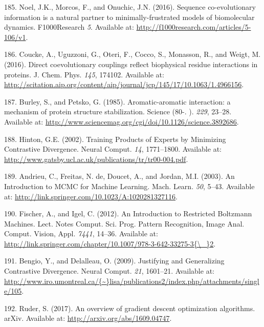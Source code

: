 \documentclass[11pt,a4paper,twoside]{book}
\theoremstyle{definition}
\theoremstyle{definition}
\theoremstyle{remark}
\begin{document}
\hypertarget{ref-Noel2016}{}
185. Noel, J.K., Morcos, F., and Onuchic, J.N. (2016). Sequence
co-evolutionary information is a natural partner to minimally-frustrated
models of biomolecular dynamics. F1000Research \emph{5}. Available at:
\url{http://f1000research.com/articles/5-106/v1}.

\hypertarget{ref-Coucke2016}{}
186. Coucke, A., Uguzzoni, G., Oteri, F., Cocco, S., Monasson, R., and
Weigt, M. (2016). Direct coevolutionary couplings reflect biophysical
residue interactions in proteins. J. Chem. Phys. \emph{145}, 174102.
Available at:
\url{http://scitation.aip.org/content/aip/journal/jcp/145/17/10.1063/1.4966156}.

\hypertarget{ref-Burley1985}{}
187. Burley, S., and Petsko, G. (1985). Aromatic-aromatic interaction: a
mechanism of protein structure stabilization. Science (80-. ).
\emph{229}, 23--28. Available at:
\url{http://www.sciencemag.org/cgi/doi/10.1126/science.3892686}.

\hypertarget{ref-Hinton2002}{}
188. Hinton, G.E. (2002). Training Products of Experts by Minimizing
Contrastive Divergence. Neural Comput. \emph{14}, 1771--1800. Available
at: \url{http://www.gatsby.ucl.ac.uk/publications/tr/tr00-004.pdf}.

\hypertarget{ref-Andrieu2003}{}
189. Andrieu, C., Freitas, N. de, Doucet, A., and Jordan, M.I. (2003).
An Introduction to MCMC for Machine Learning. Mach. Learn. \emph{50},
5--43. Available at:
\url{http://link.springer.com/10.1023/A:1020281327116}.

\hypertarget{ref-Fischer2012}{}
190. Fischer, A., and Igel, C. (2012). An Introduction to Restricted
Boltzmann Machines. Lect. Notes Comput. Sci. Prog. Pattern Recognition,
Image Anal. Comput. Vision, Appl. \emph{7441}, 14--36. Available at:
\href{http://link.springer.com/chapter/10.1007/978-3-642-33275-3\%7B/_\%7D2}{http://link.springer.com/chapter/10.1007/978-3-642-33275-3\{\textbackslash{}\_\}2}.

\hypertarget{ref-Bengio2009}{}
191. Bengio, Y., and Delalleau, O. (2009). Justifying and Generalizing
Contrastive Divergence. Neural Comput. \emph{21}, 1601--21. Available
at:
\href{http://www.iro.umontreal.ca/\%7B~\%7Dlisa/publications2/index.php/attachments/single/105}{http://www.iro.umontreal.ca/\{\textasciitilde{}\}lisa/publications2/index.php/attachments/single/105}.

\hypertarget{ref-Ruder2017}{}
192. Ruder, S. (2017). An overview of gradient descent optimization
algorithms. arXiv. Available at: \url{http://arxiv.org/abs/1609.04747}.
\end{document}
